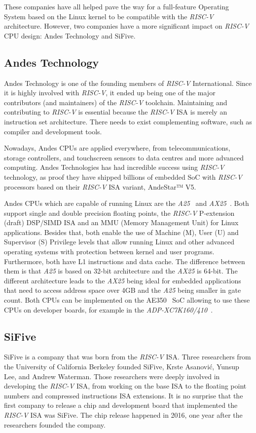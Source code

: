 These companies have all helped pave the way for a full-feature Operating System based on the Linux kernel to be compatible with the \textit{RISC-V} architecture. However, two companies have a more significant impact on \textit{RISC-V} CPU design: Andes Technology and SiFive.

\subsection{Andes Technology}
Andes Technology is one of the founding members of \textit{RISC-V} International. Since it is highly involved with \textit{RISC-V}, it ended up being one of the major contributors (and maintainers) of the \textit{RISC-V} toolchain. Maintaining and contributing to \textit{RISC-V} is essential because the \textit{RISC-V} ISA is merely an instruction set architecture. There needs to exist complementing software, such as compiler and development tools.

Nowadays, Andes CPUs are applied everywhere, from telecommunications, storage controllers, and touchscreen sensors to data centres and more advanced computing. Andes Technologies has had incredible success using \textit{RISC-V} technology, as proof they have shipped billions of embedded SoC with \textit{RISC-V} processors based on their \textit{RISC-V} ISA variant, AndeStar™ V5.

Andes CPUs which are capable of running Linux are the \textit{A25}~\cite{a25} and \textit{AX25}~\cite{ax25}. Both support single and double precision floating points, the \textit{RISC-V} P-extension (draft) DSP/SIMD ISA and an MMU (Memory Management Unit) for Linux applications. Besides that, both enable the use of Machine (M), User (U) and Supervisor (S) Privilege levels that allow running Linux and other advanced operating systems with protection between kernel and user programs. Furthermore, both have L1 instructions and data cache. The difference between them is that \textit{A25} is based on 32-bit architecture and the \textit{AX25} is 64-bit. The different architecture leads to the \textit{AX25} being ideal for embedded applications that need to access address space over 4GB and the \textit{A25} being smaller in gate count. Both CPUs can be implemented on the AE350~\cite{ae350} SoC allowing to use these CPUs on developer boards, for example in the \textit{ADP-XC7K160/410}~\cite{adp-xc7k160}.

\subsection{SiFive}
SiFive is a company that was born from the \textit{RISC-V} ISA. Three researchers from the University of California Berkeley founded SiFive, Krste Asanović, Yunsup Lee, and Andrew Waterman. Those researchers were deeply involved in developing the \textit{RISC-V} ISA, from working on the base ISA to the floating point numbers and compressed instructions ISA extensions. It is no surprise that the first company to release a chip and development board that implemented the \textit{RISC-V} ISA was SiFive. The chip release happened in 2016, one year after the researchers founded the company.

